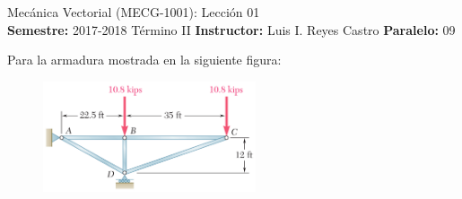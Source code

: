 \documentclass[ a4paper, twoside, 11pt]{article}
\newcommand{\numero}{01}
\begin{document}
\allowdisplaybreaks

\begin{center}
\Large Mec\'anica Vectorial (MECG-1001): Lecci\'on \numero \\[2ex]
\small \textbf{Semestre:} 2017-2018 T\'ermino II \qquad
\textbf{Instructor:} Luis I. Reyes Castro \qquad
\textbf{Paralelo:} 09
\end{center}
\fullskip

\begin{problem}
Para la armadura mostrada en la siguiente figura:

\begin{figure}[htb]
\centering
\includegraphics[width=0.56\textwidth]{prob-armadura.jpg}
\end{figure}


\end{problem}
\end{document}
